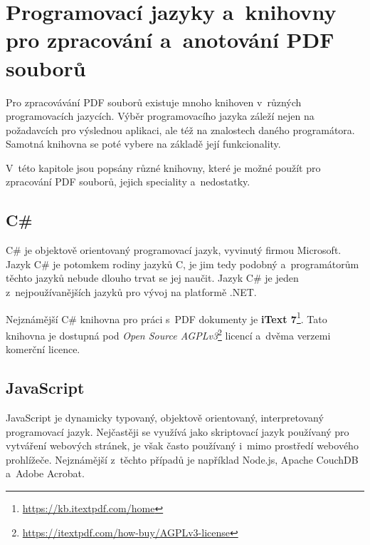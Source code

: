 \cite{PDF32000-1:2008}
\DummyText



\section{Programovací jazyky a~knihovny pro zpracování a~anotování PDF souborů}

Pro zpracovávání PDF souborů existuje mnoho knihoven v~různých programovacích
jazycích. Výběr programovacího jazyka záleží nejen na požadavcích pro výslednou
aplikaci, ale též na znalostech daného programátora. Samotná knihovna se poté
vybere na základě její funkcionality. 

V~této kapitole jsou popsány různé knihovny, které je možné použít pro zpracování
PDF souborů, jejich speciality a~nedostatky.


\subsection*{C\#}

C\# je objektově orientovaný programovací jazyk, vyvinutý firmou Microsoft.
Jazyk C\# je potomkem rodiny jazyků C, je jim tedy podobný a~programátorům těchto
jazyků nebude dlouho trvat se jej naučit. Jazyk C\# je jeden z~nejpoužívanějších
jazyků pro vývoj na platformě .NET.
\cite{CSharp}

Nejznámější C\# knihovna pro práci s~PDF dokumenty je \textbf{iText 7}\footnote{
\href{https://kb.itextpdf.com/home}{https://kb.itextpdf.com/home}
}. Tato knihovna je dostupná pod \emph{Open Source AGPLv3}\footnote{
\href{https://itextpdf.com/how-buy/AGPLv3-license}{https://itextpdf.com/how-buy/AGPLv3-license}
} licencí a~dvěma verzemi komerční licence. 

\dummyText


\subsection*{JavaScript}

JavaScript je dynamicky typovaný, objektově orientovaný, interpretovaný
programovací jazyk. Nejčastěji se využívá jako skriptovací jazyk používaný
pro vytváření webových stránek, je však často používaný i~mimo prostředí webového
prohlížeče. Nejznámější z~těchto případů je například Node.js, Apache CouchDB
a~Adobe Acrobat. 
\cite{JavaScript}

